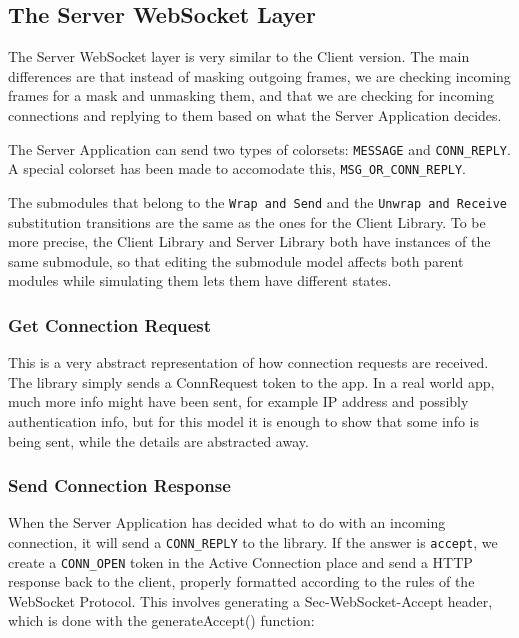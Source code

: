 \subsection{The Server WebSocket Layer}
	
	
	The Server WebSocket layer is very similar to the Client version. The main
	differences are that instead of masking outgoing frames, we are checking
	incoming frames for a mask and unmasking them, and that we are checking for
	incoming connections and replying to them based on what the Server Application
	decides.
	
	The Server Application can send two types of colorsets: \lstinline:MESSAGE: and
	\lstinline:CONN_REPLY:. A special colorset has been made to accomodate this,
	\lstinline:MSG_OR_CONN_REPLY:. 
	
	The submodules that belong to the \lstinline:Wrap and Send: and the
	\lstinline:Unwrap and Receive: substitution transitions are the same as the ones for the Client Library. To
	be more precise, the Client Library and Server Library both have instances of
	the same submodule, so that editing the submodule model affects both parent
	modules while simulating them lets them have different states.
	
	\subsubsection{Get Connection Request}
		
		
		This is a very abstract representation of how connection requests are
		received. The library simply sends a ConnRequest token to the app. In a real
		world app, much more info might have been sent, for example IP address and
		possibly authentication info, but for this model it is enough to show that
		some info is being sent, while the details are abstracted away. 

	\subsubsection{Send Connection Response}
		
		
		When the Server Application has decided what to do with an incoming
		connection, it will send a \lstinline:CONN_REPLY: to the library. If the
		answer is \lstinline:accept:, we create a \lstinline:CONN_OPEN: token in the
		Active Connection place and send a HTTP response back to the client, properly
		formatted according to the rules of the WebSocket Protocol. This involves
		generating a Sec-WebSocket-Accept header, which is done with the
		generateAccept() function:
		
